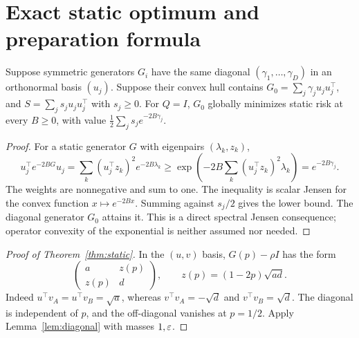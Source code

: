 \section{Exact static optimum and preparation formula}\label{app:exact}
\begin{lemma}\label{lem:diagonal}
Suppose symmetric generators $G_i$ have the same diagonal $(\gamma_1,\ldots,\gamma_D)$ in an orthonormal basis $(u_j)$. Suppose their convex hull contains $G_0=\sum_j\gamma_ju_ju_j^\top$, and $S=\sum_j s_ju_ju_j^\top$ with $s_j\ge0$. For $Q=I$, $G_0$ globally minimizes static risk at every $B\ge0$, with value $\frac12\sum_js_je^{-2B\gamma_j}$.
\end{lemma}
\begin{proof}
For a static generator $G$ with eigenpairs $(\lambda_k,z_k)$,
\[
 u_j^\top e^{-2BG}u_j=\sum_k (u_j^\top z_k)^2e^{-2B\lambda_k}
 \ge \exp\left(-2B\sum_k(u_j^\top z_k)^2\lambda_k\right)
 =e^{-2B\gamma_j}.
\]
The weights are nonnegative and sum to one. The inequality is scalar Jensen for the convex function $x\mapsto e^{-2Bx}$. Summing against $s_j/2$ gives the lower bound. The diagonal generator $G_0$ attains it. This is a direct spectral Jensen consequence; operator convexity of the exponential is neither assumed nor needed.
\end{proof}

\begin{proof}[Proof of Theorem~\ref{thm:static}]
In the $(u,v)$ basis, $G(p)-\rho I$ has the form
\begin{equation}
 \begin{pmatrix}a&z(p)\\z(p)&d\end{pmatrix},\qquad
 z(p)=(1-2p)\sqrt{ad}.\label{eq:bisector_matrix}
\end{equation}
Indeed $u^\top v_A=u^\top v_B=\sqrt a$, whereas $v^\top v_A=-\sqrt d$ and $v^\top v_B=\sqrt d$. The diagonal is independent of $p$, and the off-diagonal vanishes at $p=1/2$. Apply Lemma~\ref{lem:diagonal} with masses $1,\varepsilon$.
\end{proof}

